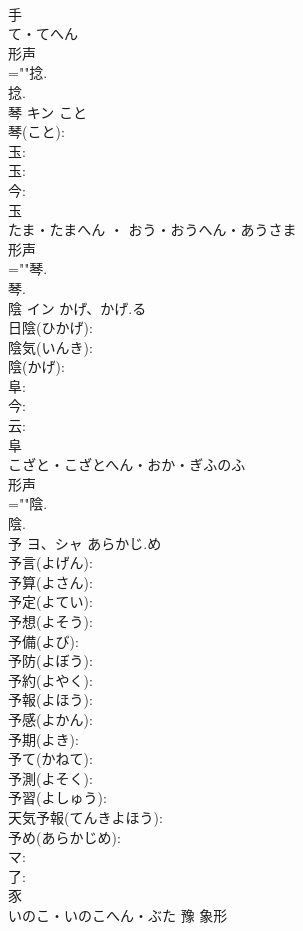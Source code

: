 \documentclass[8pt]{extreport}
\begin{document}
\begin{CJK}{UTF8}{min}
\\	手	
\\	て・てへん	
\\	形声 
\\	=""捻.
\\	捻.
\\	琴	キン	こと		
\\	琴(こと): 
\\	玉: 
\\	玉: 
\\	今: 
\\	玉	
\\	たま・たまへん ・ おう・おうへん・あうさま	
\\	形声 
\\	=""琴.
\\	琴.
\\	陰	イン	かげ、かげ.る		
\\	日陰(ひかげ): 
\\	陰気(いんき): 
\\	陰(かげ): 
\\	阜: 
\\	今: 
\\	云: 
\\	阜	
\\	こざと・こざとへん・おか・ぎふのふ	
\\	形声 
\\	=""陰.
\\	陰.
\\	予	ヨ、シャ	あらかじ.め		
\\	予言(よげん): 
\\	予算(よさん): 
\\	予定(よてい): 
\\	予想(よそう): 
\\	予備(よび): 
\\	予防(よぼう): 
\\	予約(よやく): 
\\	予報(よほう): 
\\	予感(よかん): 
\\	予期(よき): 
\\	予て(かねて): 
\\	予測(よそく): 
\\	予習(よしゅう): 
\\	天気予報(てんきよほう): 
\\	予め(あらかじめ): 
\\	マ: 
\\	了: 
\\	豕	
\\	いのこ・いのこへん・ぶた	豫	象形 

\end{CJK}
\end{document}
